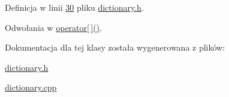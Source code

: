 Definicja w linii \hyperlink{dictionary_8h_source_l00030}{30} pliku \hyperlink{dictionary_8h_source}{dictionary.\-h}.



Odwołania w \hyperlink{dictionary_8cpp_source_l00011}{operator\mbox{[}$\,$\mbox{]}()}.



Dokumentacja dla tej klasy została wygenerowana z plików\-:\begin{DoxyCompactItemize}
\item 
\hyperlink{dictionary_8h}{dictionary.\-h}\item 
\hyperlink{dictionary_8cpp}{dictionary.\-cpp}\end{DoxyCompactItemize}
